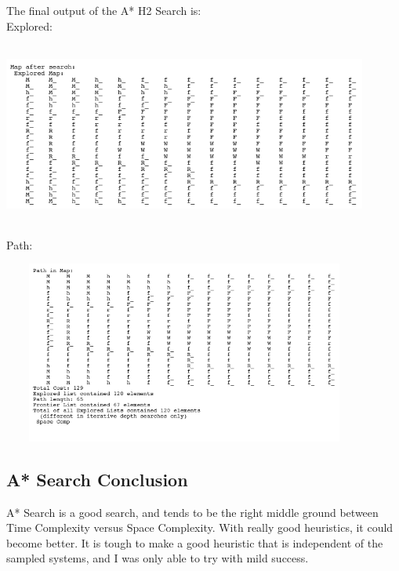 \documentclass[12pt]{article}
\begin{document}
	The final output of the A* H2 Search is:
	\\
	Explored:
	\begin{center}
		\includegraphics[width=120mm,height=60mm]{images/ah2/final_map_explored.png}
	\end{center}
	Path:
	\begin{center}
		\includegraphics[width=120mm,height=60mm]{images/ah2/final_map_path.png}
	\end{center}

	\pagebreak

	\subsection{A* Search Conclusion}
	A* Search is a good search, and tends to be the right middle ground between Time Complexity versus Space Complexity. With really good heuristics, it could become better. It is tough to make a good heuristic that is independent of the sampled systems, and I was only able to try with mild success.
\end{document}
